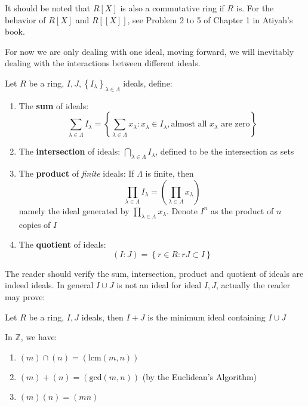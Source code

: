 \documentclass{note-eng}
\begin{document}
It should be noted that $R[X]$ is also a commutative ring if $R$ is. For the behavior of $R[X]$ and $R[[X]]$, see Problem 2 to 5 of Chapter 1 in Atiyah's book.

For now we are only dealing with one ideal, moving forward, we will inevitably dealing with the interactions between different ideals.

\begin{definition}
    Let $R$ be a ring, $I, J, \left\lbrace I_\lambda \right\rbrace_{\lambda \in \Lambda}$ ideals, define:
    \begin{enumerate}
        \item The \textbf{sum} of ideals:
        $$\sum\limits_{\lambda \in \Lambda} I_\lambda = \left\lbrace \sum\limits_{\lambda \in \Lambda} x_\lambda: x_\lambda \in I_\lambda, \text{almost all $x_\lambda$ are zero} \right\rbrace$$
        \item The \textbf{intersection} of ideals: $\bigcap\limits_{\lambda \in \Lambda} I_\lambda$, defined to be the intersection as sets
        \item The \textbf{product} of \textit{finite} ideals: If $\Lambda$ is finite, then
        $$\prod\limits_{\lambda \in \Lambda} I_\lambda = \left( \prod\limits_{\lambda \in A} x_\lambda \right)$$
        namely the ideal generated by $\prod\limits_{\lambda \in \Lambda} x_\lambda$. Denote $I^n$ as the product of $n$ copies of $I$
        \item The \textbf{quotient} of ideals:
        $$(I:J) = \left\lbrace r \in R: rJ \subset I \right\rbrace$$
    \end{enumerate}
\end{definition}

The reader should verify the sum, intersection, product and quotient of ideals are indeed ideals. In general $I \cup J$ is not an ideal for ideal $I, J$, actually the reader may prove:

\begin{proposition}
    Let $R$ be a ring, $I, J$ ideals, then $I + J$ is the minimum ideal containing $I \cup J$
\end{proposition}

\begin{example}
    In $\mathbb{Z}$, we have:
    \begin{enumerate}
        \item $(m) \cap (n) = (\mathrm{lcm}(m, n))$
        \item $(m) + (n) = (\mathrm{gcd}(m, n))$ (by the Euclidean's Algorithm)
        \item $(m) (n) = (mn)$
    \end{enumerate}
\end{example}
\end{document}
